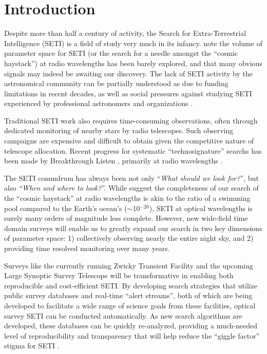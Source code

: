 \documentclass[twocolumn]{aastex62}
\begin{document}


\section{Introduction}

Despite more than half a century of activity, the Search for Extra-Terrestrial Intelligence (SETI) is a field of study very much in its infancy. 
\citet{wright2018c} note the volume of parameter space for SETI (or the search for a needle amongst the ``cosmic haystack'') at radio wavelengths has been barely explored, and that many obvious signals may indeed be awaiting our discovery. 
The lack of SETI activity by the astronomical community can be partially understood as due to funding limitations in recent decades, as well as social pressures against studying SETI experienced by professional astronomers and organizations \citep{wright2018b}. 


Traditional SETI work also requires time-consuming observations, often through dedicated monitoring of nearby stars by radio telescopes. Such observing campaigns are expensive and difficult to obtain given the competitive nature of telescope allocation. Recent progress for systematic ``technosignature'' searchs has been made by Breakthrough Listen \citep{worden2017,isaacson2017}, primarily at radio wavelengths \citep[e.g.][]{price2018}. 


The SETI conundrum has always been not only ``{\it What should we look for?}'', but  also {\it ``When and where to look?}''. 
While \citet{wright2018c} suggest the completeness of our search of the ``cosmic haystack'' at radio wavelengths is akin to the ratio of a swimming pool compared to the Earth's ocean's ($\sim$10$^{-20}$), SETI at optical wavelengths is surely many orders of magnitude less complete. However, new wide-field time domain surveys will enable us to greatly expand our search in two key dimensions of parameter space: 1) collectively observing nearly the entire night sky, and 2) providing time resolved monitoring over many years. 


Surveys like the currently running Zwicky Transient Facility \citep[ZTF][]{bellm2014} and the upcoming Large Synoptic Survey Telescope \citep[LSST][]{lsst} will be transformative in enabling both reproducible and cost-efficient SETI. By developing search strategies that utilize public survey databases and real-time ``alert streams'', both of which are being developed to facilitate a wide range of science goals from these facilities, optical survey SETI can be conducted automatically. As new search algorithms are developed, these databases can be quickly re-analyzed, providing a much-needed level of reproducibility and transparency that will help reduce the ``giggle factor'' stigma for SETI \citep{wright2018b}.
\end{document}
